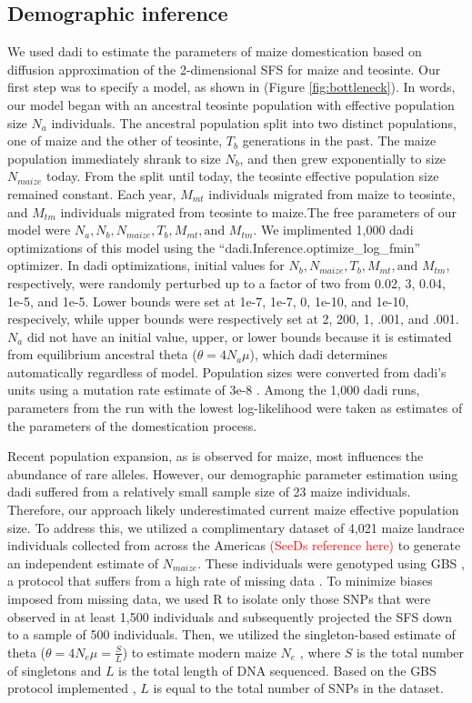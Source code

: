 \documentclass{pnastwo}
\begin{document}
\begin{article}
\begin{materials}
\subsection{Demographic inference}
We used dadi \cite{gutenkunst2009} to estimate the parameters of maize
domestication based on diffusion approximation of the 2-dimensional
SFS for maize and teosinte. Our first step was to specify a model, as
shown in (Figure \ref{fig:bottleneck}). In words, our model began with an ancestral teosinte
population with effective population size $N_a$ individuals. The
ancestral population split into
two distinct populations, one of maize and the other of teosinte,
$T_b$ generations in the past. The maize population immediately shrank
to size $N_b$, and then grew exponentially to size $N_{maize}$
today. From the split until today, the teosinte effective population
size remained constant. Each year, $M_{mt}$ individuals migrated from
maize to teosinte, and $M_{tm}$ individuals migrated from teosinte to
maize.The free parameters of our model were $N_a, N_b, N_{maize}, T_b,
M_{mt}, \text{and } M_{tm} $. We implimented 1,000 dadi
optimizations of this model using the ``dadi.Inference.optimize\_log\_fmin''
optimizer. In dadi optimizations,
initial values for $N_b, N_{maize}, T_b,
M_{mt}, \text{and } M_{tm}$, respectively, were randomly perturbed up
to a factor of two from 0.02, 3, 0.04, 1e-5, and 1e-5. Lower
bounds were set at 1e-7, 1e-7,  0, 1e-10, and
1e-10, respecively, while upper bounds were respectively set at 2,
200, 1, .001, and .001. $N_a$ did not have an initial value, upper, or
lower bounds because it is estimated from equilibrium ancestral theta
($\theta = 4N_a\mu$), which dadi determines automatically regardless
of model. Population sizes were converted from dadi's
units using a mutation rate estimate of 3e-8
\cite{clark2005}. Among the 1,000 dadi runs, parameters
from the run with the lowest log-likelihood were taken as estimates of
the parameters of the domestication process.

Recent population expansion, as is observed for maize, most influences
the abundance of rare alleles. However, our demographic parameter
estimation using dadi suffered from a relatively small sample size of
23 maize individuals. Therefore, our approach likely underestimated
current maize effective population size. To address this, we utilized
a complimentary dataset of 4,021 maize landrace individuals collected
from across the Americas \textcolor{red}{(SeeDs reference here)} to
generate an independent estimate of
$N_{maize}$. These individuals were genotyped using GBS
\cite{elshire2011}, a protocol that suffers from a high rate of
missing data \cite{beissinger2013}. To minimize biases imposed from
missing data, we used R to isolate only those SNPs that
were observed in at least 1,500 individuals and subsequently projected the
SFS down to a sample of 500 individuals. Then, we utilized the singleton-based estimate of
theta ($\theta = 4N_e\mu = \frac{S}{L}$) to estimate
modern maize $N_e$ \cite{fu1993}, where $S$ is the total number of
singletons and $L$ is the total length of DNA sequenced. Based on the
GBS protocol implemented \cite{elshire2011}, $L$ is equal to the total
number of SNPs in the dataset.


\end{materials}
\end{article}
\end{document}
